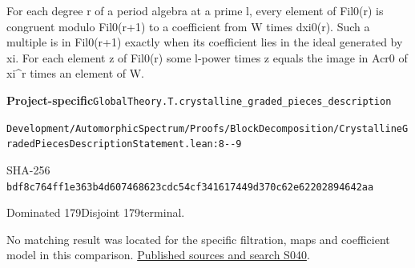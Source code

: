 
\begin{formalstatement}[D302]\label{decomp:D302}
For each degree r of a period algebra at a prime l, every element of Fil0(r) is congruent modulo Fil0(r+1) to a coefficient from W times dxi0(r). Such a multiple is in Fil0(r+1) exactly when its coefficient lies in the ideal generated by xi. For each element z of Fil0(r) some l-power times z equals the image in Acr0 of xi\textasciicircum{}r times an element of W.
\end{formalstatement}
{\small\raggedright\noindent\textsf{\bfseries Project-specific}\quad \nolinkurl{GlobalTheory.T.crystalline_graded_pieces_description}\par\noindent \nolinkurl{Development/AutomorphicSpectrum/Proofs/BlockDecomposition/CrystallineGradedPiecesDescriptionStatement.lean:8--9}\par\noindent SHA-256 \nolinkurl{bdf8c764ff1e363b4d607468623cdc54cf341617449d370c62e62202894642aa}\par\noindent Dominated 179\quad Disjoint 179\quad terminal.\par}
No matching result was located for the specific filtration, maps and coefficient model in this comparison.
\hyperref[lit:S040]{Published sources and search S040}.
